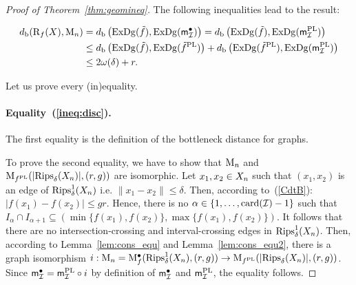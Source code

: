 \begin{proof}[Proof of Theorem~\ref{thm:geomineq}]

The following inequalities lead to the result:




\begin{align}
\dper(\Reeb_f(\Xset),\Map_n) & =\dper\left(\Dg(\freeb{f}),\Dg(\fM^\bullet)\right) 
= \dper\left(\Dg(\freeb{f}),\Dg(\fRPLMtel)\right) %
\label{ineq:disc} \\ %
&\leq \dper\left(\Dg(\freeb{f}),\Dg(\frips{\freeb{f}})\right) + \dper\left(\Dg(\frips{\freeb{f}}), %
\Dg(\fRPLMtel)\right)\label{ineq:tri}\\ %
&\leq  2\omega(\delta)+ r.
\label{ineq:th}
\end{align}

Let us prove every (in)equality.

\paragraph*{Equality~(\ref{ineq:disc}).}
The first equality is the definition of the bottleneck distance for graphs. %

To prove the second equality, we have to show that $\mathrm{M}_n$ and $\mathrm{M}_{{{f}^{\rm PL}}}(|\mathrm{Rips}_\delta(X_n)|,(r,g))$ are isomorphic.
Let $x_1,x_2\in X_n$ such that $(x_1,x_2)$ is an edge of $\mathrm{Rips}^1_\delta(X_n)$ i.e.
$\|x_1-x_2\|\leq \delta$. Then, according to~(\ref{CdtB}): $|f(x_1)-f(x_2)|\leq gr$. 
Hence, there is no $\alpha\in\{1,\dots,{\rm card}(\mathcal{I})-1\}$ such that $I_\alpha\cap I_{\alpha+1}\subseteq (\min\{f(x_1),f(x_2)\},\max\{f(x_1),f(x_2)\})$.
It follows that there are no intersection-crossing and interval-crossing edges in $\mathrm{Rips}^1_\delta(X_n)$.
Then, according to Lemma~\ref{lem:cons_equ} and Lemma~\ref{lem:cons_equ2},
there is a graph isomorphism $i:\mathrm{M}_n= \mathrm{M}^\bullet_f(\mathrm{Rips}_\delta^1(X_n),(r,g))\rightarrow\mathrm{M}_{{{f}^{\rm PL}}}(|\mathrm{Rips}_\delta(X_n)|,(r,g))$.
Since ${\sf m}_{\mathcal I}^\bullet={\sf{m}^{\rm PL}_{\mathcal I}}\circ i$ by definition of ${\sf m}_{\mathcal I}^\bullet$ and ${\sf{m}^{\rm PL}_{\mathcal I}}$, the equality follows.


\end{proof}
